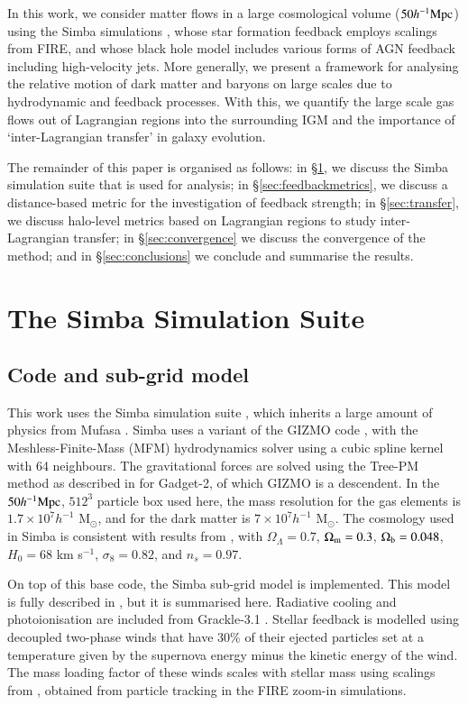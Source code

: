 \documentclass[fleqn,usenatbib]{mnras}
\newcommand{\hmpc}{h^{-1}{\rm Mpc}}
\newcommand{\mufasa}{{\sc Mufasa}}
\newcommand{\simba}{{\sc Simba}}
\begin{document}
In this work, we consider matter flows in a large cosmological volume ($50
\hmpc{}$) using the \simba{} simulations \citep{Dave2019}, whose star
formation feedback employs scalings from FIRE, and whose black hole model
includes various forms of AGN feedback including high-velocity jets. More
generally, we present a framework for analysing the relative motion of dark
matter and baryons on large scales due to hydrodynamic and feedback
processes. With this, we quantify the large scale gas flows out of Lagrangian
regions into the surrounding IGM and the importance of `inter-Lagrangian
transfer' in galaxy evolution.

The remainder of this paper is organised as follows: in \S\ref{sec:simba}, we
discuss the \simba{} simulation suite that is used for analysis; in
\S\ref{sec:feedbackmetrics}, we discuss a distance-based metric for the
investigation of feedback strength; in \S\ref{sec:transfer}, we discuss
halo-level metrics based on Lagrangian regions to study inter-Lagrangian
transfer; in \S\ref{sec:convergence} we discuss the convergence of the
method; and in \S\ref{sec:conclusions} we conclude and summarise the results. \section{The \simba{} Simulation Suite}
\label{sec:simba}

\subsection{Code and sub-grid model}

This work uses the \simba{} simulation suite \citep{Dave2019}, which inherits
a large amount of physics from \mufasa{} \citep{Dave2016}. \simba{} uses a
variant of the GIZMO code \citep{Hopkins2015}, with the Meshless-Finite-Mass
(MFM) hydrodynamics solver using a cubic spline kernel with
64 neighbours. The gravitational forces are solved using the Tree-PM method
as described in \citet{Springel2005b} for Gadget-2, of which GIZMO is a
descendent. In the $50 \hmpc{}$, $512^3$ particle box used here, the mass
resolution for the gas elements is $1.7\times10^7h^{-1}$ M$_\odot$, and for
the dark matter is $7\times10^7h^{-1}$ M$_\odot$. The cosmology used in
\simba{} is consistent with results from \citet{PlanckCollaboration2016},
with $\Omega_\Lambda = 0.7$, $\Omega_{\rm m} = 0.3$, $\Omega_{\rm b} =
0.048$, $H_0 = 68$ km s$^{-1}$, $\sigma_8=0.82$, and $n_s=0.97$.

On top of this base code, the \simba{} sub-grid model is implemented. This
model is fully described in \citet{Dave2019}, but it is summarised here.
Radiative cooling and photoionisation are included from Grackle-3.1
\citep{Smith2016}. Stellar feedback is modelled using decoupled two-phase
winds that have 30\% of their ejected particles set at a temperature given by
the supernova energy minus the kinetic energy of the wind. The mass loading
factor of these winds scales with stellar mass using scalings from
\citet{AnglesAlcazar2017}, obtained from particle tracking in the FIRE
zoom-in simulations.
\end{document}
